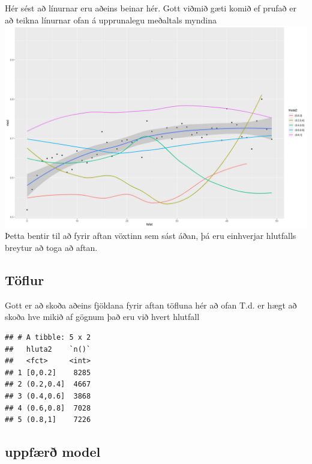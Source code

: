\documentclass[
]{article}
\newenvironment{Shaded}{\begin{snugshade}}{\end{snugshade}}
\newcommand{\KeywordTok}[1]{\textcolor[rgb]{0.13,0.29,0.53}{\textbf{#1}}}
\newcommand{\NormalTok}[1]{#1}
\newcommand{\OperatorTok}[1]{\textcolor[rgb]{0.81,0.36,0.00}{\textbf{#1}}}
\newcommand{\StringTok}[1]{\textcolor[rgb]{0.31,0.60,0.02}{#1}}
\begin{document}
Hér sést að línurnar eru aðeins beinar hér. Gott viðmið gæti komið ef prufað er að teikna línurnar ofan á upprunalegu meðaltals myndina
\includegraphics{Img/meabwhsbyhlutfall.png}
Þetta bentir til að fyrir aftan vöxtinn sem sást áðan, þá eru einhverjar hlutfalls breytur að toga að aftan.

\hypertarget{tuxf6flur}{%
\subsection{Töflur}\label{tuxf6flur}}

Gott er að skoða aðeins fjöldana fyrir aftan töfluna hér að ofan
T.d. er hægt að skoða hve mikið af gögnum það eru við hvert hlutfall

\begin{Shaded}
\end{Shaded}

\begin{verbatim}
## # A tibble: 5 x 2
##   hluta2    `n()`
##   <fct>     <int>
## 1 [0,0.2]    8285
## 2 (0.2,0.4]  4667
## 3 (0.4,0.6]  3868
## 4 (0.6,0.8]  7028
## 5 (0.8,1]    7226
\end{verbatim}

\hypertarget{uppfuxe6ruxf0-model}{%
\subsection{uppfærð model}\label{uppfuxe6ruxf0-model}}
\end{document}

